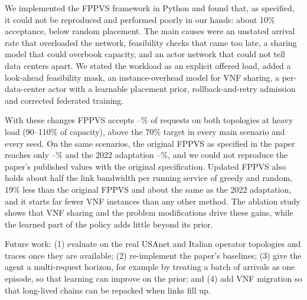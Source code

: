 We implemented the FPPVS framework in Python and found that, as specified, it
could not be reproduced and performed poorly in our hands: about 10\%
acceptance, below random placement. The main causes were an unstated arrival
rate that overloaded the network, feasibility checks that came too late, a
sharing model that could overbook capacity, and an actor network that could not
tell data centers apart. We stated the workload as an explicit offered load,
added a look-ahead feasibility mask, an instance-overhead model for VNF sharing,
a per-data-center actor with a learnable placement prior, rollback-and-retry
admission and corrected federated training.

With these changes FPPVS accepts \fppvsMinAcc--\fppvsMaxAcc\% of requests on
both topologies at heavy load (90--110\% of capacity), above the 70\% target in every
main scenario and every seed. On the same scenarios, the original FPPVS as
specified in the paper reaches only \origMinAcc--\origMaxAcc\% and the 2022
adaptation \zhangMinAcc--\zhangMaxAcc\%, and we could not reproduce the paper's
published values with the original specification. Updated FPPVS also holds
about half the link bandwidth per running service of greedy and random, 19\%
less than the original FPPVS and about the same as the 2022 adaptation, and it
starts far fewer VNF instances than any other method.
The ablation study shows that VNF sharing and the problem
modifications drive these gains, while the learned part of the policy adds
little beyond its prior.

Future work: (1) evaluate on the real USAnet and Italian operator topologies and
traces once they are available; (2) re-implement the paper's baselines; (3) give
the agent a multi-request horizon, for example by treating a batch of arrivals
as one episode, so that learning can improve on the prior; and (4) add VNF
migration so that long-lived chains can be repacked when links fill up.
